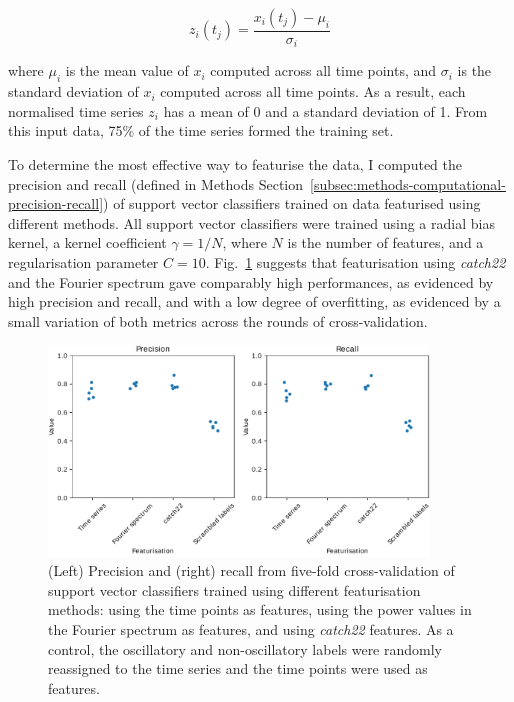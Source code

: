 \begin{equation}
  z_{i}(t_{j}) = \frac{x_{i}(t_{j}) - \mu_{i}}{\sigma_{i}}
  \label{eq:analysis-stdscore}
\end{equation}

where $\mu_{i}$ is the mean value of $x_{i}$ computed across all time points, and $\sigma_{i}$ is the standard deviation of $x_{i}$ computed across all time points.
As a result, each normalised time series $z_{i}$ has a mean of 0 and a standard deviation of 1.
From this input data, 75\% of the time series formed the training set.

To determine the most effective way to featurise the data, I computed the precision and recall (defined in Methods Section~\ref{subsec:methods-computational-precision-recall}) of support vector classifiers trained on data featurised using different methods.
All support vector classifiers were trained using a radial bias kernel, a kernel coefficient $\gamma = 1/N$, where $N$ is the number of features, and a regularisation parameter $C = 10$.
Fig.\ \ref{fig:analysis-precision-recall} suggests that featurisation using \textit{catch22} and the Fourier spectrum gave comparably high performances, as evidenced by high precision and recall, and with a low degree of overfitting, as evidenced by a small variation of both metrics across the rounds of cross-validation.

\begin{figure}
  \centering
  \includegraphics[width=0.9\textwidth]{svm_feat_compare_edit.pdf}
  \caption[
    Precision and recall from five-fold cross-validation of support vector classifiers trained using different featurisation methods.
  ]{
    (Left) Precision and (right) recall from five-fold cross-validation of support vector classifiers trained using different featurisation methods:
    using the time points as features,
    using the power values in the Fourier spectrum as features,
    and using \emph{catch22} features.
    As a control, the oscillatory and non-oscillatory labels were randomly reassigned to the time series and the time points were used as features.
  }
  \label{fig:analysis-precision-recall}
\end{figure}

